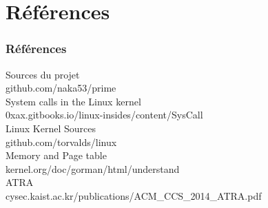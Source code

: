 \documentclass{beamer}
\begin{document}
\section{Références}
\begin{frame}[allowframebreaks]
\frametitle{Références}
\begin{thebibliography}{}
	Sources du projet\\
	github.com/naka53/prime\\
	System calls in the Linux kernel\\
	0xax.gitbooks.io/linux-insides/content/SysCall\\
	Linux Kernel Sources\\
	github.com/torvalds/linux\\
	Memory and Page table\\
	kernel.org/doc/gorman/html/understand\\
	ATRA\\
	cysec.kaist.ac.kr/publications/ACM\_CCS\_2014\_ATRA.pdf\\
\end{thebibliography}
\end{frame}
\end{document}

